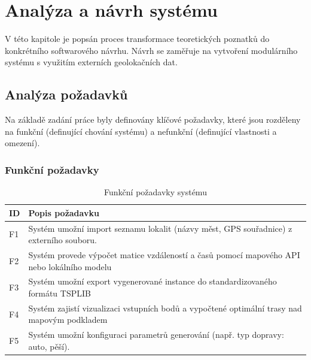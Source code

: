 \chapter{Analýza a návrh systému}
V této kapitole je popsán proces transformace teoretických poznatků do konkrétního softwarového návrhu. Návrh se zaměřuje na vytvoření modulárního systému s využitím externích geolokačních dat.

\section{Analýza požadavků}
Na základě zadání práce byly definovány klíčové požadavky, které jsou rozděleny na funkční (definující chování systému) a nefunkční (definující vlastnosti a omezení).

\subsection{Funkční požadavky}
\begin{table}[ht]
\centering
\begin{tabular}{|l|p{10cm}|}
\hline
\textbf{ID} & \textbf{Popis požadavku} \\ \hline
F1 & Systém umožní import seznamu lokalit (názvy měst, GPS souřadnice) z externího souboru. \\ \hline
F2 & Systém provede výpočet matice vzdáleností a časů pomocí mapového API nebo lokálního modelu
\\ \hline
F3 & Systém umožní export vygenerované instance do standardizovaného formátu TSPLIB
\\ \hline
F4 & Systém zajistí vizualizaci vstupních bodů a vypočtené optimální trasy nad mapovým podkladem
\\ \hline
F5 & Systém umožní konfiguraci parametrů generování (např. typ dopravy: auto, pěší). \\ \hline
\end{tabular}
\caption{Funkční požadavky systému}
\end{table}

\clearpage

